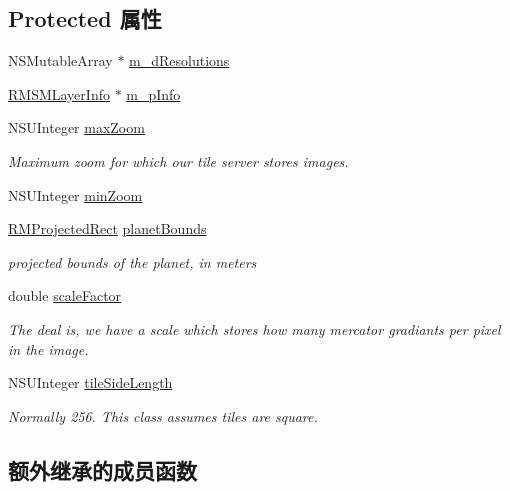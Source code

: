 \subsection*{Protected 属性}
\begin{DoxyCompactItemize}
\item 
N\-S\-Mutable\-Array $\ast$ \hyperlink{interface_r_m_s_m_tile_projection_a3010dfce00c774103e1e13008cedfae9}{m\-\_\-d\-Resolutions}
\item 
\hyperlink{interface_r_m_s_m_layer_info}{R\-M\-S\-M\-Layer\-Info} $\ast$ \hyperlink{interface_r_m_s_m_tile_projection_a9f1a037cccec0d7e4de974b541bce0ee}{m\-\_\-p\-Info}
\item 
N\-S\-U\-Integer \hyperlink{interface_r_m_s_m_tile_projection_ad7bfc790b1fbb0f87c9dd3708bba7ca7}{max\-Zoom}
\begin{DoxyCompactList}\small\item\em Maximum zoom for which our tile server stores images. \end{DoxyCompactList}\item 
N\-S\-U\-Integer \hyperlink{interface_r_m_s_m_tile_projection_af52e70bac54d3c9c229f38850dfaa195}{min\-Zoom}
\item 
\hyperlink{struct_r_m_projected_rect}{R\-M\-Projected\-Rect} \hyperlink{interface_r_m_s_m_tile_projection_a441495eb7464318f709e32b3ba889ab7}{planet\-Bounds}
\begin{DoxyCompactList}\small\item\em projected bounds of the planet, in meters \end{DoxyCompactList}\item 
double \hyperlink{interface_r_m_s_m_tile_projection_ad254771d183309cf4caced68e589da2c}{scale\-Factor}
\begin{DoxyCompactList}\small\item\em The deal is, we have a scale which stores how many mercator gradiants per pixel in the image. \end{DoxyCompactList}\item 
N\-S\-U\-Integer \hyperlink{interface_r_m_s_m_tile_projection_a879a1a2b92a2a00b75d55953df996ce3}{tile\-Side\-Length}
\begin{DoxyCompactList}\small\item\em Normally 256. This class assumes tiles are square. \end{DoxyCompactList}\end{DoxyCompactItemize}
\subsection*{额外继承的成员函数}


